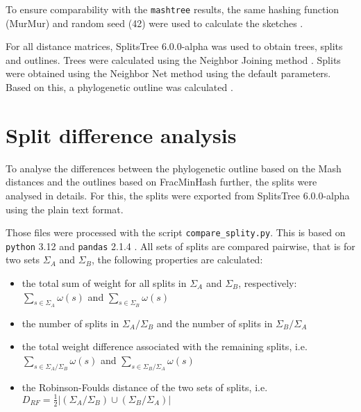 To ensure comparability with the \texttt{mashtree} results, the same hashing
function (MurMur) and random seed (42) were used to calculate the sketches
\cite{katzMashtreeRapidComparison2019,ondovMashFastGenome2016}.

For all distance matrices, SplitsTree 6.0.0-alpha
\cite{husonApplicationPhylogeneticNetworks2006} was used to obtain trees, splits
and outlines. Trees were calculated using the Neighbor Joining method
\cite{saitouNeighborjoiningMethodNew1987}. Splits were obtained using the
Neighbor Net method
\cite{bryantNeighborNetAgglomerativeMethod2004,bryantNeighborNetImprovedAlgorithms2023}
using the default parameters. Based on this, a phylogenetic outline was
calculated \cite{bagciMicrobialPhylogeneticContext2021}.



\section{Split difference analysis}
\label{sec:splitanalysis}
To analyse the differences between the phylogenetic outline based on the Mash
distances and the outlines based on FracMinHash further, the splits were
analysed in details. For this, the splits were exported from SplitsTree
6.0.0-alpha \cite{husonApplicationPhylogeneticNetworks2006} using the plain text
format.

Those files were processed with the script \texttt{compare\_splity.py}. This is
based on \texttt{python} 3.12  and \texttt{pandas} 2.1.4
\cite{PandasdevPandasPandas2024,mckinneyDataStructuresStatistical2010}. All sets
of splits are compared pairwise, that is for two sets $\Sigma_A$ and $\Sigma_B$,
the following properties are calculated:

\begin{itemize}
  \item the total sum of weight for all splits in $\Sigma_A$ and $\Sigma_B$,
  respectively: $\sum_{s \in \Sigma_A}{\omega(s)}$ and $\sum_{s \in
  \Sigma_B}{\omega(s)}$ 
  \item the number of splits in $\Sigma_A / \Sigma_B$ and the number of splits
  in $\Sigma_B / \Sigma_A$
  \item the total weight difference associated with the remaining splits, i.e.
  $\sum_{s \in \Sigma_A / \Sigma_B}{\omega(s)}$ and $\sum_{s \in \Sigma_B /
  \Sigma_A}{\omega(s)}$
  \item the Robinson-Foulds distance
  \cite{robinsonComparisonPhylogeneticTrees1981} of the two sets of splits, i.e.
  $D_{RF} = \frac{1}{2}|(\Sigma_A / \Sigma_B) \cup (\Sigma_B / \Sigma_A)|$
\end{itemize}

